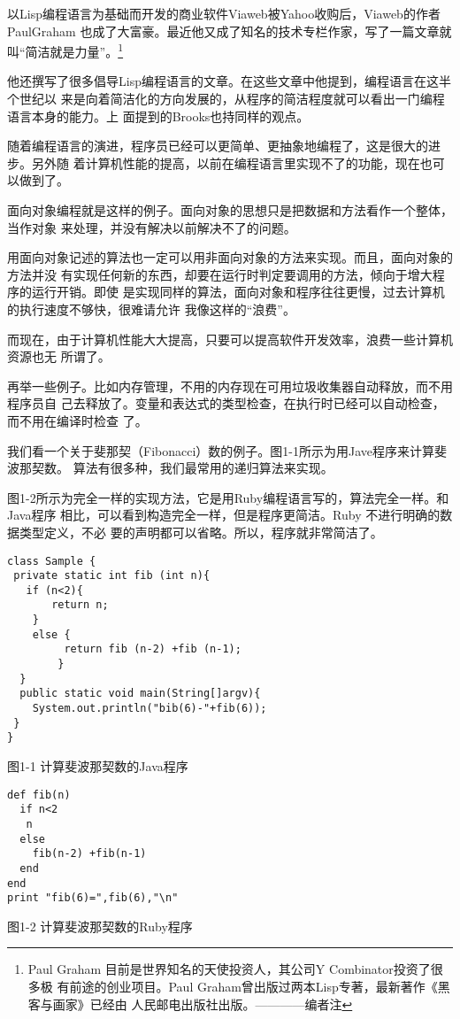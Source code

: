 \documentclass[11pt]{ctexart}
\begin{document}
以Lisp编程语言为基础而开发的商业软件Viaweb被Yahoo收购后，Viaweb的作者PaulGraham
也成了大富豪。最近他又成了知名的技术专栏作家，写了一篇文章就叫“简洁就是力量”。\footnote{Paul Graham 目前是世界知名的天使投资人，其公司Y Combinator投资了很多极
有前途的创业项目。Paul Graham曾出版过两本Lisp专著，最新著作《黑客与画家》已经由
人民邮电出版社出版。————编者注}

他还撰写了很多倡导Lisp编程语言的文章。在这些文章中他提到，编程语言在这半个世纪以
来是向着简洁化的方向发展的，从程序的简洁程度就可以看出一门编程语言本身的能力。上
面提到的Brooks也持同样的观点。

随着编程语言的演进，程序员已经可以更简单、更抽象地编程了，这是很大的进步。另外随
着计算机性能的提高，以前在编程语言里实现不了的功能，现在也可以做到了。

面向对象编程就是这样的例子。面向对象的思想只是把数据和方法看作一个整体，当作对象
来处理，并没有解决以前解决不了的问题。

用面向对象记述的算法也一定可以用非面向对象的方法来实现。而且，面向对象的方法并没
有实现任何新的东西，却要在运行时判定要调用的方法，倾向于增大程序的运行开销。即使
是实现同样的算法，面向对象和程序往往更慢，过去计算机的执行速度不够快，很难请允许
我像这样的“浪费”。

而现在，由于计算机性能大大提高，只要可以提高软件开发效率，浪费一些计算机资源也无
所谓了。

再举一些例子。比如内存管理，不用的内存现在可用垃圾收集器自动释放，而不用程序员自
己去释放了。变量和表达式的类型检查，在执行时已经可以自动检查，而不用在编译时检查
了。

我们看一个关于斐那契（Fibonacci）数的例子。图1-1所示为用Jave程序来计算斐波那契数。
算法有很多种，我们最常用的递归算法来实现。

图1-2所示为完全一样的实现方法，它是用Ruby编程语言写的，算法完全一样。和Java程序
相比，可以看到构造完全一样，但是程序更简洁。Ruby 不进行明确的数据类型定义，不必
要的声明都可以省略。所以，程序就非常简洁了。
\lstset{language=org,label= ,caption= ,captionpos=b,numbers=none}
\begin{lstlisting}
class Sample {
 private static int fib (int n){
   if (n<2){
       return n;
    }
    else {
         return fib (n-2) +fib (n-1);
        }
  }
  public static void main(String[]argv){
    System.out.println("bib(6)-"+fib(6));
 }
}
\end{lstlisting}
图1-1 计算斐波那契数的Java程序
\lstset{language=org,label= ,caption= ,captionpos=b,numbers=none}
\begin{lstlisting}
def fib(n)
  if n<2
   n
  else
    fib(n-2) +fib(n-1)
  end
end
print "fib(6)=",fib(6),"\n"
\end{lstlisting}
图1-2 计算斐波那契数的Ruby程序
\end{document}
